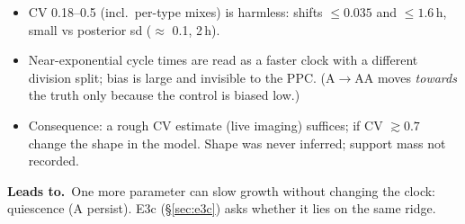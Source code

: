 \documentclass[10pt,a4paper]{article}
\newcommand{\blk}[1]{\par\needspace{5\baselineskip}\smallskip{\sffamily\bfseries\color{inkgray}#1}\par}
\newcommand{\Comment}{\blk{Comment}}
\newcommand{\Leads}[1]{\begin{leadbox}{\sffamily\bfseries\color{caqua!70!black}Leads to.}\ #1\end{leadbox}}
\renewcommand{\blk}[1]{\par\Needspace*{5\baselineskip}\smallskip{\sffamily\bfseries\color{inkgray}#1}\par}
\newcommand{\sref}[1]{\S\ref{#1}}
\begin{document}
\Comment
\begin{itemize}
\item CV 0.18--0.5 (incl.\ per-type mixes) is harmless: shifts $\le 0.035$ and $\le 1.6$\,h, small vs posterior sd ($\approx$ 0.1, 2\,h).
\item Near-exponential cycle times are read as a faster clock with a different division split; bias is large and invisible to the PPC. (A$\to$AA moves \emph{towards} the truth only because the control is biased low.)
\item Consequence: a rough CV estimate (live imaging) suffices; if CV $\gtrsim 0.7$ change the shape in the model. Shape was never inferred; support mass not recorded.
\end{itemize}
\Leads{One more parameter can slow growth without changing the clock: quiescence (A persist). E3c (\sref{sec:e3c}) asks whether it lies on the same ridge.}
\end{document}
